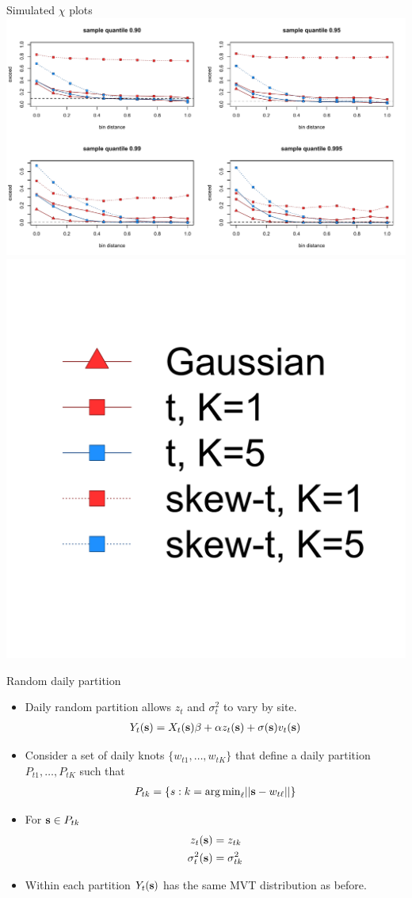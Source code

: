 \documentclass{beamer}
\begin{document}
\begin{frame}{Simulated $\chi$ plots}
  \centering
  \includegraphics[width=1\linewidth]{./plots/chi-plots.pdf}\\[-0.25in]
  \includegraphics[width=0.2\linewidth]{./plots/chi-legend.pdf}
\end{frame}

\begin{frame}{Random daily partition}
  \begin{itemize} \setlength{\itemsep}{0.5em}
    \item Daily random partition allows $z_t$ and $\sigma^2_t$ to vary by site.
    \begin{align*}
      Y_t(\mbox{\bf s}) = X_t(\mbox{\bf s}) \beta + \alpha z_t(\mbox{\bf s}) + \sigma(\mbox{\bf s}) v_t(\mbox{\bf s})
    \end{align*}
    \item Consider a set of daily knots $\{w_{t1}, \ldots, w_{tK}\}$ that define a daily partition
    $P_{t1}, \ldots, P_{tK}$ such that
    \begin{align*}
      P_{tk} = \{s : k = {\mathop{\rm arg\, min}}_\ell|| \mbox{\bf s} - w_{t\ell}|| \}
    \end{align*}
    \item For $\mbox{\bf s} \in P_{tk}$
    \begin{align*}
      z_t(\mbox{\bf s}) &= z_{tk}\\
      \sigma^2_t(\mbox{\bf s}) &= \sigma^2_{tk}
    \end{align*}
    \item Within each partition $Y_t(\mbox{\bf s})$ has the same MVT distribution as before.
  \end{itemize}
\end{frame}
\end{document}
